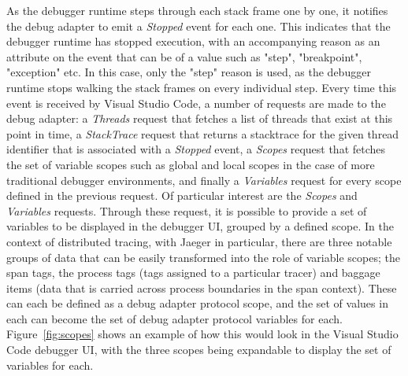 \documentclass[12pt,pdftex,titlepage]{report}
\begin{document}
            As the debugger runtime steps through each stack frame one by one, it notifies the debug adapter to emit a \textit{Stopped} event for each one. This indicates that the debugger runtime has stopped execution, with an accompanying reason 
            as an attribute on the event that can be of a value such as "step", "breakpoint", "exception" etc. In this case, only the "step" reason is used, as the debugger runtime stops walking the stack frames on every individual step. Every time
            this event is received by Visual Studio Code, a number of requests are made to the debug adapter: a \textit{Threads} request that fetches a list of threads that exist at this point in time, a \textit{StackTrace} request that returns
            a stacktrace for the given thread identifier that is associated with a \textit{Stopped} event, a \textit{Scopes} request that fetches the set of variable scopes such as global and local scopes in the case of more traditional debugger
            environments, and finally a \textit{Variables} request for every scope defined in the previous request. Of particular interest are the \textit{Scopes} and \textit{Variables} requests. Through these request, it is possible to provide a 
            set of variables to be displayed in the debugger UI, grouped by a defined scope. In the context of distributed tracing, with Jaeger in particular, there are three notable groups of data that can be easily transformed into the role of
            variable scopes; the span tags, the process tags (tags assigned to a particular tracer) and baggage items (data that is carried across process boundaries in the span context). These can each be defined as a debug adapter protocol scope,
            and the set of values in each can become the set of debug adapter protocol variables for each. Figure~\ref{fig:scopes} shows an example of how this would look in the Visual Studio Code debugger UI, with the three scopes being expandable
            to display the set of variables for each. 
\end{document}
